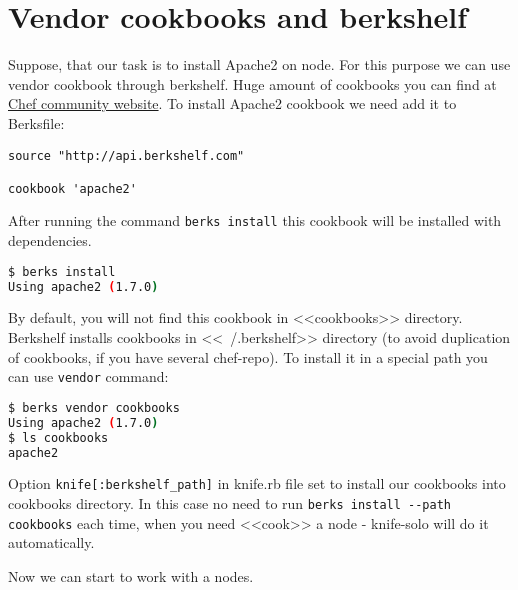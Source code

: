 \section{Vendor cookbooks and berkshelf}
\label{sec:solo-berkshelf}

Suppose, that our task is to install Apache2 on node. For this purpose we can use vendor cookbook through berkshelf. Huge amount of cookbooks you can find at \href{https://supermarket.getchef.com/cookbooks-directory}{Chef community website}. To install Apache2 cookbook we need add it to Berksfile:

\begin{lstlisting}[label=lst:my-cloud-berkshelf1,title=my-cloud/Berksfile]
source "http://api.berkshelf.com"

cookbook 'apache2'
\end{lstlisting}

After running the command \lstinline!berks install! this cookbook will be installed with dependencies.

\begin{lstlisting}[language=Bash,label=lst:my-cloud-berkshelf2]
$ berks install
Using apache2 (1.7.0)
\end{lstlisting}

By default, you will not find this cookbook in <<cookbooks>> directory. Berkshelf installs cookbooks in <<~/.berkshelf>> directory (to avoid duplication of cookbooks, if you have several chef-repo). To install it in a special path you can use \lstinline!vendor! command:

\begin{lstlisting}[language=Bash,label=lst:my-cloud-berkshelf3]
$ berks vendor cookbooks
Using apache2 (1.7.0)
$ ls cookbooks
apache2
\end{lstlisting}

Option \lstinline!knife[:berkshelf_path]! in knife.rb file set to install our cookbooks into cookbooks directory. In this case no need to run \lstinline!berks install --path cookbooks! each time, when you need <<cook>> a node - knife-solo will do it automatically.

Now we can start to work with a nodes.
